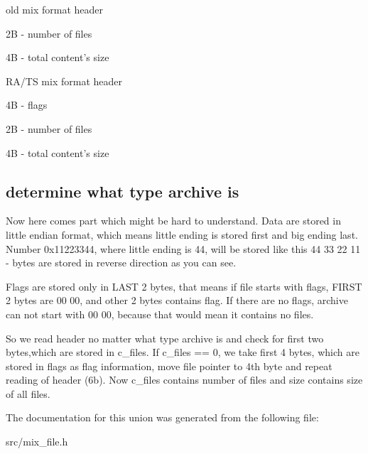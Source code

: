\begin{DoxyParagraph}{old mix format header}

\begin{DoxyItemize}
\item 2B -\/ number of files
\item 4B -\/ total content's size
\end{DoxyItemize}
\end{DoxyParagraph}
\begin{DoxyParagraph}{RA/TS mix format header}

\begin{DoxyItemize}
\item 4B -\/ flags
\item 2B -\/ number of files
\item 4B -\/ total content's size
\end{DoxyItemize}
\end{DoxyParagraph}
\hypertarget{uniont__mix__header_archivetype}{}\subsection{determine what type archive is}\label{uniont__mix__header_archivetype}
Now here comes part which might be hard to understand. Data are stored in little endian format, which means little ending is stored first and big ending last. Number 0x11223344, where little ending is 44, will be stored like this 44 33 22 11 -\/ bytes are stored in reverse direction as you can see.

Flags are stored only in LAST 2 bytes, that means if file starts with flags, FIRST 2 bytes are 00 00, and other 2 bytes contains flag. If there are no flags, archive can not start with 00 00, because that would mean it contains no files.

So we read header no matter what type archive is and check for first two bytes,which are stored in c\_\-files. If c\_\-files == 0, we take first 4 bytes, which are stored in flags as flag information, move file pointer to 4th byte and repeat reading of header (6b). Now c\_\-files contains number of files and size contains size of all files. 

The documentation for this union was generated from the following file:\begin{DoxyCompactItemize}
\item 
src/mix\_\-file.h\end{DoxyCompactItemize}

